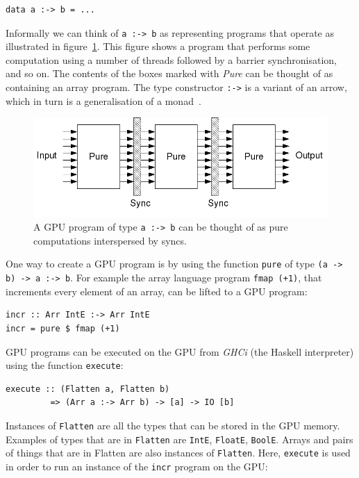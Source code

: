 \begin{small}
\begin{verbatim} 
data a :-> b = ... 
\end{verbatim}
\end{small} 
\noindent
\noindent
Informally we can think of {\tt a\nolinebreak~:->\nolinebreak~b} as representing programs that operate 
as illustrated in figure~\ref{fig:program}. This figure 
shows a program that performs some computation using a number of threads 
followed by a barrier synchronisation, and so on. The contents of the 
boxes marked with {\em Pure} can be thought of as containing an array 
program.%
The type constructor {\tt :->} is a variant of an arrow, which in turn is a generalisation of a monad~.
%
\begin{figure}
\begin{center}
\includegraphics[width=.60\linewidth]{./papp/pictures/prg_intuit.jpg}
\caption{A GPU program of type  {\tt a :-> b} can be thought 
of as pure computations interspersed by syncs.}
\label{fig:program}
\end{center}
\end{figure}
\noindent
One way to create a GPU program is by using the function {\tt pure} of type {\tt (a -> b) -> a :-> b}.
For example the array language program {\tt fmap (+1)}, that increments 
every element of an array, can be lifted to a GPU program: 
%
\begin{small}
\begin{verbatim}
incr :: Arr IntE :-> Arr IntE 
incr = pure $ fmap (+1)
\end{verbatim}
\end{small} 
 \noindent
GPU programs can be executed on the GPU from
{\em GHCi} (the Haskell interpreter) using the function {\tt execute}: 

\begin{small}
\begin{verbatim}
execute :: (Flatten a, Flatten b) 
         => (Arr a :-> Arr b) -> [a] -> IO [b]
\end{verbatim}
\end{small}
\noindent
Instances of {\tt Flatten} are all the types that can be stored in the 
GPU memory. Examples of types that are in {\tt Flatten} are {\tt IntE}, 
{\tt FloatE}, {\tt BoolE}. Arrays and pairs of things that are in Flatten 
are also instances of {\tt Flatten}.
Here, {\tt execute} is used in order to run an instance of the {\tt incr} 
program on the GPU:

